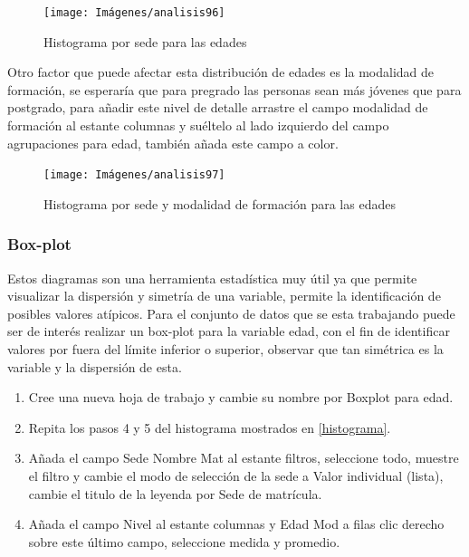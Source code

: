 \documentclass[
]{book}
\begin{document}
\begin{figure}

{\centering \texttt{[image: Imágenes/analisis96]} 

}

\caption{Histograma por sede para las edades}\label{fig:histogramafiltrosede-fig}
\end{figure}

Otro factor que puede afectar esta distribución de edades es la modalidad de formación, se esperaría que para pregrado las personas sean más jóvenes que para postgrado, para añadir este nivel de detalle arrastre el campo modalidad de formación al estante columnas y suéltelo al lado izquierdo del campo agrupaciones para edad, también añada este campo a color.

\begin{figure}

{\centering \texttt{[image: Imágenes/analisis97]} 

}

\caption{Histograma por sede y modalidad de formación para las edades}\label{fig:histogramafiltrosedemodalidad-fig}
\end{figure}

\hypertarget{boxplot}{%
\subsubsection{Box-plot}\label{boxplot}}

Estos diagramas son una herramienta estadística muy útil ya que permite visualizar la dispersión y simetría de una variable, permite la identificación de posibles valores atípicos. Para el conjunto de datos que se esta trabajando puede ser de interés realizar un box-plot para la variable edad, con el fin de identificar valores por fuera del límite inferior o superior, observar que tan simétrica es la variable y la dispersión de esta.

\begin{enumerate}
\def\labelenumi{\arabic{enumi}.}
\item
  Cree una nueva hoja de trabajo y cambie su nombre por Boxplot para edad.
\item
  Repita los pasos 4 y 5 del histograma mostrados en \ref{histograma}.
\item
  Añada el campo Sede Nombre Mat al estante filtros, seleccione todo, muestre el filtro y cambie el modo de selección de la sede a Valor individual (lista), cambie el titulo de la leyenda por Sede de matrícula.
\item
  Añada el campo Nivel al estante columnas y Edad Mod a filas clic derecho sobre este último campo, seleccione medida y promedio.
\end{enumerate}
\end{document}
